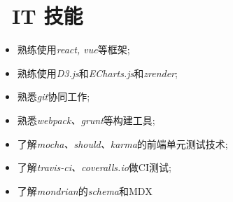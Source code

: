 \documentclass{resume}
\begin{document}
\section{\faCogs\ IT 技能}
\begin{itemize}[parsep=0.5ex]
  \item 熟练使用\textit{react, vue}等框架;
  \item 熟练使用\textit{D3.js}和\textit{ECharts.js}和\textit{zrender};
  \item 熟悉\textit{git}协同工作;
  \item 熟悉\textit{webpack、grunt}等构建工具;
  \item 了解\textit{mocha、should、karma}的前端单元测试技术;
  \item 了解\textit{travis-ci、coveralls.io}做CI测试;
  \item 了解\textit{mondrian}的\textit{schema}和MDX
\end{itemize}
\end{document}

